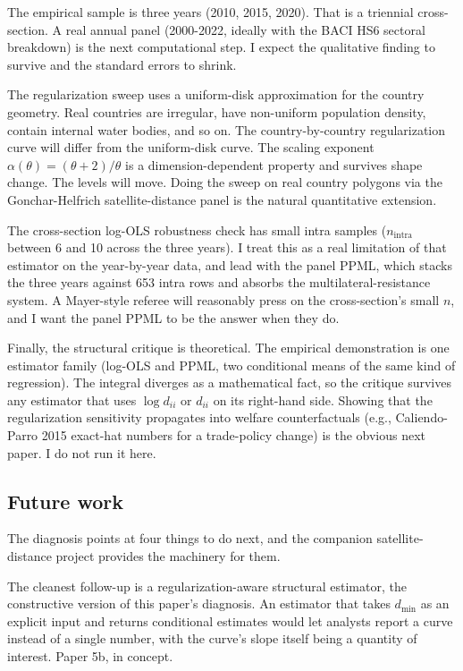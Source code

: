 \documentclass[11pt, letterpaper]{article}
\theoremstyle{definition}
\newcommand{\dii}{d_{ii}}
\begin{document}
The empirical sample is three years (2010, 2015, 2020). That is a
triennial cross-section. A real annual panel (2000-2022, ideally
with the BACI HS6 sectoral breakdown) is the next computational
step. I expect the qualitative finding to survive and the standard
errors to shrink.

The regularization sweep uses a uniform-disk approximation for the
country geometry. Real countries are irregular, have non-uniform
population density, contain internal water bodies, and so on. The
country-by-country regularization curve will differ from the
uniform-disk curve. The scaling exponent $\alpha(\theta) = (\theta+2)/\theta$
is a dimension-dependent property and survives shape change. The
levels will move. Doing the sweep on real country polygons via the
Gonchar-Helfrich satellite-distance panel is the natural quantitative
extension.

The cross-section log-OLS robustness check has small intra samples
($n_{\text{intra}}$ between 6 and 10 across the three years). I
treat this as a real limitation of that estimator on the year-by-year
data, and lead with the panel PPML, which stacks the three years
against 653 intra rows and absorbs the multilateral-resistance
system. A Mayer-style referee will reasonably press on the
cross-section's small $n$, and I want the panel PPML to be the
answer when they do.

Finally, the structural critique is theoretical. The empirical
demonstration is one estimator family (log-OLS and PPML, two
conditional means of the same kind of regression). The integral
diverges as a mathematical fact, so the critique survives any
estimator that uses $\log \dii$ or $\dii$ on its right-hand side.
Showing that the regularization sensitivity propagates into welfare
counterfactuals (e.g., Caliendo-Parro 2015 exact-hat numbers for a
trade-policy change) is the obvious next paper. I do not run it
here.

\subsection{Future work}

The diagnosis points at four things to do next, and the companion
satellite-distance project provides the machinery for them.

The cleanest follow-up is a regularization-aware structural
estimator, the constructive version of this paper's diagnosis. An
estimator that takes $d_{\min}$ as an explicit input and returns
conditional estimates would let analysts report a curve instead of
a single number, with the curve's slope itself being a quantity of
interest. Paper 5b, in concept.
\end{document}
